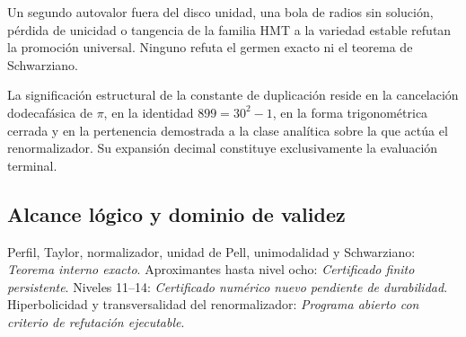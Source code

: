 \begin{remark}
Un segundo autovalor fuera del disco unidad, una bola de radios sin soluci\'on, p\'erdida de unicidad o tangencia de la familia HMT a la variedad estable refutan la promoci\'on universal. Ninguno refuta el germen exacto ni el teorema de Schwarziano.
\end{remark}

\begin{proposition}
La significaci\'on estructural de la constante de duplicaci\'on reside en la
cancelaci\'on dodecaf\'asica de \(\pi\), en la identidad
\(899=30^2-1\), en la forma trigonom\'etrica cerrada y en la pertenencia
demostrada a la clase anal\'itica sobre la que act\'ua el renormalizador. Su
expansi\'on decimal constituye exclusivamente la evaluaci\'on terminal.
\end{proposition}

\subsection*{Alcance lógico y dominio de validez}
Perfil, Taylor, normalizador, unidad de Pell, unimodalidad y Schwarziano: \emph{Teorema interno exacto}. Aproximantes hasta nivel ocho: \emph{Certificado finito persistente}. Niveles 11--14: \emph{Certificado num\'erico nuevo pendiente de durabilidad}. Hiperbolicidad y transversalidad del renormalizador: \emph{Programa abierto con criterio de refutación ejecutable}.

